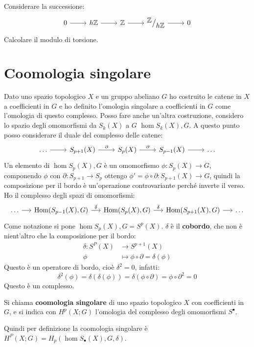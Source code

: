  \begin{exercise}
   Considerare la successione:
   \[
     \begin{tikzcd}
       0 \rar & h \Z \rar & \Z \rar & \quot{\Z}{h \Z} \rar & 0
     \end{tikzcd}
   \]
   Calcolare il modulo di torsione.
 \end{exercise}

\section{Coomologia singolare}

Dato uno spazio topologico $ X $ e un gruppo abeliano $ G $ ho costruito le
catene in $ X $ a coefficienti in $ G $ e ho definito l'omologia singolare a
coefficienti in $ G $ come l'omologia di questo complesso. Posso fare anche un'altra
costruzione, considero lo spazio degli omomorfismi da $ S_k(X) $ a $ G $
$ \hom{S_k(X), G} $. A questo punto posso considerare il duale del complesso delle catene:
\[
  \begin{tikzcd}
    \dots \rar & S_{p+1}(X) \rar{\partial} & S_p(X) \rar{\partial} & S_{p-1}(X) \rar & \dots
  \end{tikzcd}
\]
Un elemento di $ \hom{S_p(X), G} $ è un omomorfismo $ \phi \colon S_p(X) \to G $, componendo $ \phi $
con $ \partial \colon S_{p+1} \to S_p $ ottengo  $ \phi' = \phi \circ \partial \colon S_{p+1}(X) \to G $, quindi la composizione
per il bordo è un'operazione controvariante perché inverte il verso. Ho il complesso degli spazi
di omomorfismi:
\[
  \begin{tikzcd}[nodes = {column sep = 14 pt}]
    \dots \rar & \hom{S_{p-1}(X),G} \rar{\delta} & \hom{S_p(X),G} \rar{\delta} & \hom{S_{p+1}(X),G} \rar & \dots
  \end{tikzcd}
\]
Come notazione si pone $ \hom{S_p(X),G} = S^p(X) $. $ \delta $ è il \textbf{cobordo},
che non è nient'altro che la composizione per il bordo:
\begin{align*}
  \delta \colon S^P(X) & \to S^{p+1}(X) \\
  \phi & \mapsto \phi \circ \partial = \delta(\phi)
\end{align*}
Questo è un operatore di bordo, cioè $ \delta^2 = 0 $, infatti:
\[
  \delta^2(\phi) = \delta(\delta(\phi)) = \delta (\phi \circ \partial) = \phi \circ \partial^2 = 0
\]
Questo è un complesso.
\begin{definition}
  Si chiama \textbf{coomologia singolare} di uno
  spazio topologico $ X $ con coefficienti in $ G $, e si indica con
  $ H^p(X; G) $ l'omologia del complesso degli omomorfismi $ S^\bullet $.
\end{definition}
Quindi per definizione la coomologia singolare è $ H^P(X;G) = H_p(\hom{S_\bullet(X), G}, \delta) $.

